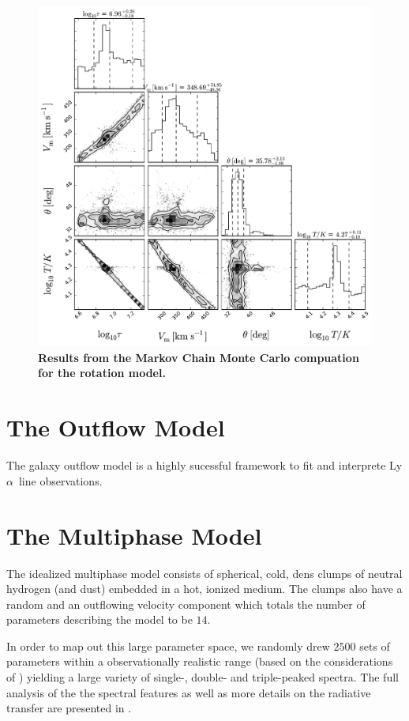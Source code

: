 \documentclass[a4paper, usenatbib, 12pt]{article}
\newcommand{\lya}{Ly$\alpha$}
\begin{document}
{\begin{figure}
\begin{center}
\includegraphics[width=1.0\textwidth]{emcee_results.pdf}
\caption{{\bf Results from the Markov Chain Monte Carlo compuation for
    the rotation model.}\label{emceeresults}} 
\end{center}
\end{figure}


\section*{The Outflow Model}
The galaxy outflow model is a highly sucessful framework to fit
and interprete \lya\ line observations. 



\section*{The Multiphase Model} 

The idealized multiphase model consists of spherical, cold, dens
clumps of neutral hydrogen (and dust) embedded in a hot, ionized
medium. 
The clumps also have a random and an outflowing velocity
component which totals the number of parameters describing the model
to be $14$. 

In order to map out this large parameter space, we randomly drew
$2500$ sets of parameters within a observationally realistic range
(based on the considerations of \cite{Laursen2013ApJ...766..124L})
yielding a large variety of single-, double- and triple-peaked
spectra. 
The full analysis of the the spectral features as well as
more details on the radiative transfer are presented in
\cite{Gronke2016}.    
 
}
\end{document}
